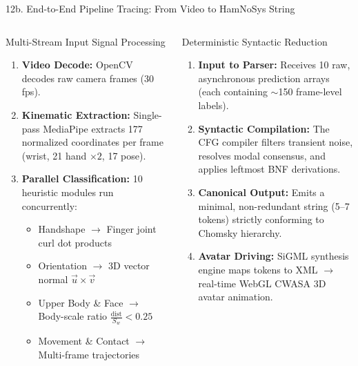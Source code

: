 \documentclass[aspectratio=169]{beamer}
\begin{document}
\begin{frame}[t]{12b. End-to-End Pipeline Tracing: From Video to HamNoSys String}
\vspace{2.0mm}
\begin{columns}[T]
    \begin{block}{Multi-Stream Input Signal Processing}
        \fontsize{6.8pt}{8.6pt}\selectfont
        \begin{enumerate}\setlength{\itemsep}{0.06cm}
            \item \textbf{Video Decode:} OpenCV decodes raw camera frames (30 fps).
            \item \textbf{Kinematic Extraction:} Single-pass MediaPipe extracts 177 normalized coordinates per frame (wrist, 21 hand $\times 2$, 17 pose).
            \item \textbf{Parallel Classification:} 10 heuristic modules run concurrently:
            \begin{itemize}\setlength{\itemsep}{0.02cm}
                \item Handshape $\to$ Finger joint curl dot products
                \item Orientation $\to$ 3D vector normal $\vec{u} \times \vec{v}$
                \item Upper Body \& Face $\to$ Body-scale ratio $\frac{\text{dist}}{S_w} < 0.25$
                \item Movement \& Contact $\to$ Multi-frame trajectories
            \end{itemize}
        \end{enumerate}
    \end{block}

    \begin{block}{Deterministic Syntactic Reduction}
        \fontsize{6.8pt}{8.6pt}\selectfont
        \begin{enumerate}\setlength{\itemsep}{0.06cm}
            \item \textbf{Input to Parser:} Receives 10 raw, asynchronous prediction arrays (each containing $\sim$150 frame-level labels).
            \item \textbf{Syntactic Compilation:} The CFG compiler filters transient noise, resolves modal consensus, and applies leftmost BNF derivations.
            \item \textbf{Canonical Output:} Emits a minimal, non-redundant string (5--7 tokens) strictly conforming to Chomsky hierarchy.
            \item \textbf{Avatar Driving:} SiGML synthesis engine maps tokens to XML $\to$ real-time WebGL CWASA 3D avatar animation.
        \end{enumerate}
    \end{block}
\end{columns}
\end{frame}
\end{document}
